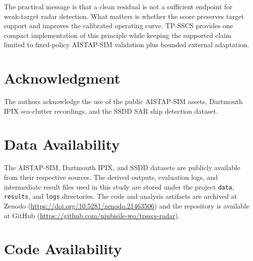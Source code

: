 \documentclass[journal]{IEEEtran}
\begin{document}
The practical message is that a clean residual is not a sufficient endpoint for weak-target radar detection. What matters is whether the score preserves target support and improves the calibrated operating curve. TP-SSCS provides one compact implementation of this principle while keeping the supported claim limited to fixed-policy AISTAP-SIM validation plus bounded external adaptation.

\balance
\section*{Acknowledgment}

The authors acknowledge the use of the public AISTAP-SIM assets, Dartmouth IPIX sea-clutter recordings, and the SSDD SAR ship detection dataset.

\section*{Data Availability}

The AISTAP-SIM, Dartmouth IPIX, and SSDD datasets are publicly available from their respective sources. The derived outputs, evaluation logs, and intermediate result files used in this study are stored under the project \texttt{data}, \texttt{results}, and \texttt{logs} directories. The code and analysis artifacts are archived at Zenodo (\url{https://doi.org/10.5281/zenodo.21463506}) and the repository is available at GitHub (\url{https://github.com/niubisile-wq/tpsscs-radar}).

\section*{Code Availability}
\end{document}

